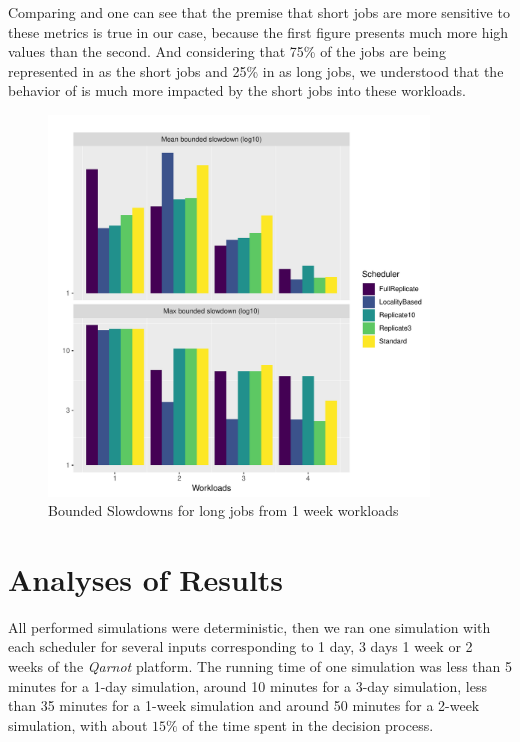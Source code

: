 Comparing  and  one can see that the premise that short jobs are more sensitive to these metrics is true in our case, because the first figure presents much more high values than the second.
And considering that 75\% of the jobs are being represented in  as the short jobs and 25\% in  as long jobs, we understood that the behavior of  is much more impacted by the short jobs into these workloads. 

\begin{figure} [H]
\centering
    \includegraphics[width=0.9\textwidth]{images/experiments/metrics/long_metrics_slowdown.pdf}
    \caption{Bounded Slowdowns for long jobs from 1 week workloads}
    \label{fig:long-bounded-slowdown}
\end{figure}

\section{Analyses of Results}

All performed simulations were deterministic, then we ran one simulation with each scheduler for several inputs corresponding to 1 day, 3 days 1 week or 2 weeks of the \emph{Qarnot} platform.
The running time of one simulation was less than 5 minutes for a 1-day simulation, around 10 minutes for a 3-day simulation, less than 35 minutes for a 1-week simulation and around 50 minutes for a 2-week simulation, with about $15\%$ of the time spent in the decision process.

